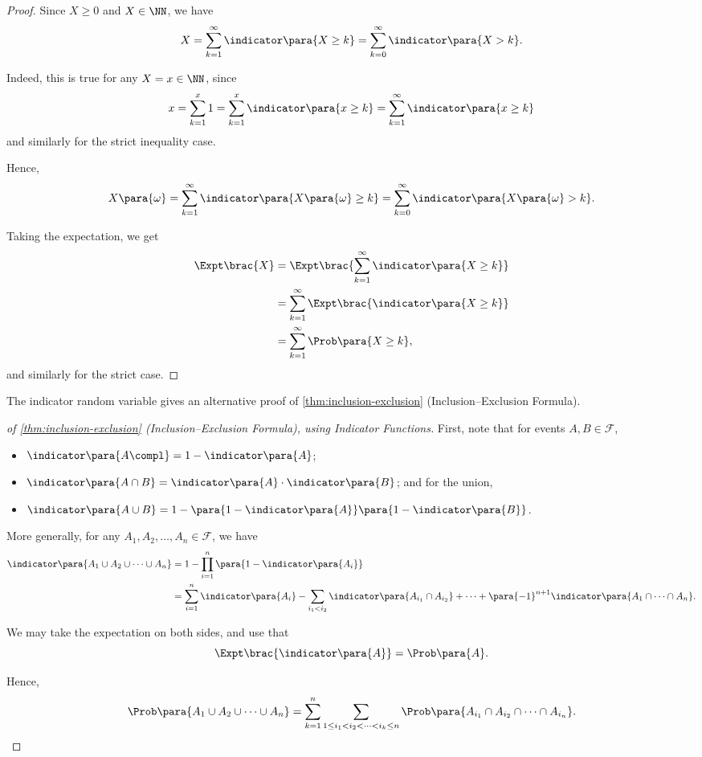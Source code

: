 \begin{proof}
    Since \(X \geq 0\) and \(X \in \NN\), we have
    \[
        X = \sum_{k = 1}^{\infty} \indicator \para{X \geq k} = \sum_{k = 0}^{\infty} \indicator \para{X > k}.
    \]

    Indeed, this is true for any \(X = x \in \NN\), since
    \[
        x = \sum_{k = 1}^{x} 1 = \sum_{k = 1}^{x} \indicator \para{x \geq k} = \sum_{k = 1}^{\infty} \indicator \para{x \geq k}
    \]
    and similarly for the strict inequality case.

    Hence,
    \[
        X \para{\omega} = \sum_{k = 1}^{\infty} \indicator \para{X \para{\omega} \geq k} = \sum_{k = 0}^{\infty} \indicator \para{X \para{\omega} > k}.
    \]

    Taking the expectation, we get
    \begin{align*}
        \Expt\brac{X} &= \Expt\brac{\sum_{k = 1}^{\infty} \indicator\para{X \geq k}} \\
        &= \sum_{k = 1}^{\infty} \Expt\brac{\indicator\para{X \geq k}} \\
        &= \sum_{k = 1}^{\infty} \Prob\para{X \geq k},
    \end{align*}
    and similarly for the strict case.
\end{proof}

The indicator random variable gives an alternative proof of \autoref{thm:inclusion-exclusion} (Inclusion--Exclusion Formula).

\begin{proof}[of \autoref{thm:inclusion-exclusion} (Inclusion--Exclusion Formula), using Indicator Functions]
    First, note that for events \(A, B \in \mathcal{F}\),
    \begin{itemize}
        \item \(\indicator\para{A\compl} = 1 - \indicator\para{A}\);
        \item \(\indicator\para{A \cap B} = \indicator\para{A} \cdot \indicator\para{B}\); and for the union,
        \item \(\indicator\para{A \cup B} = 1 - \para{1 - \indicator\para{A}} \para{1 - \indicator\para{B}}\).
    \end{itemize}

    More generally, for any \(A_1, A_2, \ldots, A_n \in \mathcal{F}\), we have
    \begin{align*}
        \indicator\para{A_1 \cup A_2 \cup \cdots \cup A_n} &= 1 - \prod_{i = 1}^{n} \para{1 - \indicator\para{A_i}} \\
        &= \sum_{i = 1}^{n} \indicator \para{A_i} - \sum_{i_1 < i_2} \indicator\para{A_{i_1} \cap A_{i_2}} + \cdots + \para{-1}^{n + 1} \indicator\para{A_1 \cap \cdots \cap A_n}.
    \end{align*}

    We may take the expectation on both sides, and use that
    \[
        \Expt\brac{\indicator\para{A}} = \Prob\para{A}.
    \]

    Hence,
    \[
        \Prob\para{A_1 \cup A_2 \cup \cdots \cup A_n} = \sum_{k = 1}^{n} \sum_{1 \leq i_1 < i_2 < \cdots < i_k \leq n} \Prob\para{A_{i_1} \cap A_{i_2} \cap \cdots \cap A_{i_n}}.
    \]
\end{proof}

